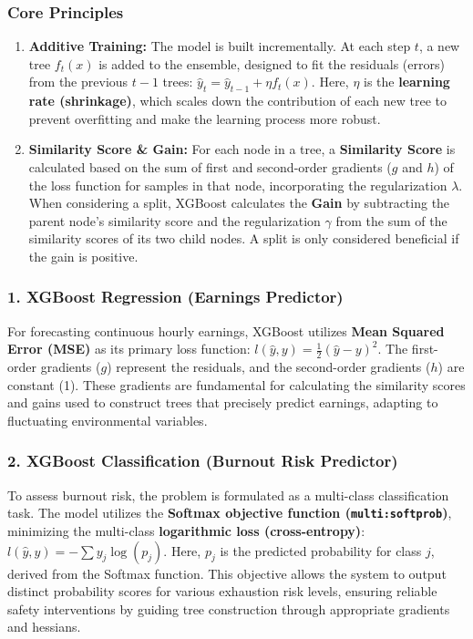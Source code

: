 \documentclass[12pt,a4paper]{article}
\begin{document}
\subsubsection*{Core Principles}
\begin{enumerate}
    \item \textbf{Additive Training:} The model is built incrementally. At each step $t$, a new tree $f_t(x)$ is added to the ensemble, designed to fit the residuals (errors) from the previous $t-1$ trees: $\hat{y}_t = \hat{y}_{t-1} + \eta f_t(x)$. Here, $\eta$ is the \textbf{learning rate (shrinkage)}, which scales down the contribution of each new tree to prevent overfitting and make the learning process more robust.
    \item \textbf{Similarity Score \& Gain:} For each node in a tree, a \textbf{Similarity Score} is calculated based on the sum of first and second-order gradients ($g$ and $h$) of the loss function for samples in that node, incorporating the regularization $\lambda$. When considering a split, XGBoost calculates the \textbf{Gain} by subtracting the parent node's similarity score and the regularization $\gamma$ from the sum of the similarity scores of its two child nodes. A split is only considered beneficial if the gain is positive.
\end{enumerate}

\subsubsection*{1. XGBoost Regression (Earnings Predictor)}
\par\noindent
For forecasting continuous hourly earnings, XGBoost utilizes \textbf{Mean Squared Error (MSE)} as its primary loss function: $l(\hat{y}, y) = \frac{1}{2}(\hat{y} - y)^2$. The first-order gradients ($g$) represent the residuals, and the second-order gradients ($h$) are constant (1). These gradients are fundamental for calculating the similarity scores and gains used to construct trees that precisely predict earnings, adapting to fluctuating environmental variables.

\vspace{0.4cm}
\subsubsection*{2. XGBoost Classification (Burnout Risk Predictor)}
\par\noindent
To assess burnout risk, the problem is formulated as a multi-class classification task. The model utilizes the \textbf{Softmax objective function (\texttt{multi:softprob})}, minimizing the multi-class \textbf{logarithmic loss (cross-entropy)}: $l(\hat{y}, y) = -\sum y_j \log(p_j)$. Here, $p_j$ is the predicted probability for class $j$, derived from the Softmax function. This objective allows the system to output distinct probability scores for various exhaustion risk levels, ensuring reliable safety interventions by guiding tree construction through appropriate gradients and hessians.
\newpage
\end{document}
